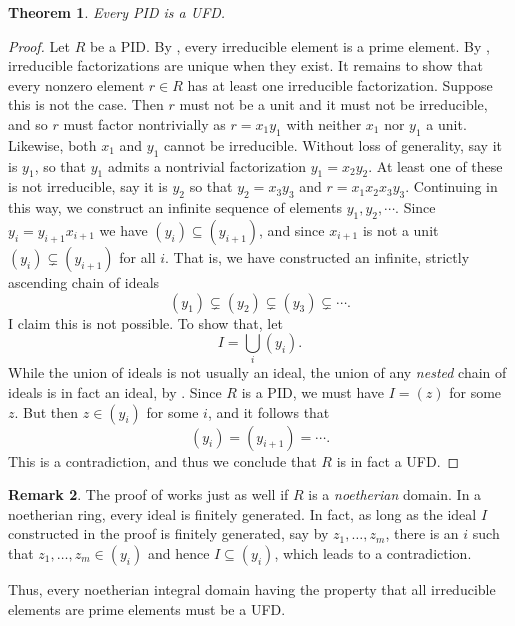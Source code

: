 \documentclass[12pt]{report}
\newtheorem{theorem}{Theorem}[chapter]
\numberwithin{equation}{section}
\numberwithin{theorem}{chapter}
\theoremstyle{definition}
\newtheorem*{basic properties}{Basic Properties}
\newtheorem*{Important Remark}{Important Remark}
\newtheorem{remark}[theorem]{Remark}
\begin{document}
\begin{theorem}\label{PID implies UFD}
Every PID is a UFD.
\end{theorem}

\begin{proof} 
Let $R$ be a PID.
By , every irreducible element is a prime element.
By , irreducible factorizations are unique when they exist. 
It remains to show that every nonzero element $r \in R$ has at least one irreducible factorization. Suppose this is not the case. Then $r$ must not be a unit and it must not be irreducible, and so $r$ must factor nontrivially as $r =x_1 y_1$ with neither $x_1$ nor $y_1$ a unit. Likewise, both $x_1$ and $y_1$ cannot be irreducible. Without loss of generality, say it is $y_1$, so that $y_1$ admits a nontrivial factorization $y_1 = x_2 y_2$. At least one of these is not irreducible, say it is $y_2$ so that $y_2 = x_3 y_3$ and $r = x_1x_2x_3y_3$. 
Continuing in this way, we construct an infinite sequence of elements $y_1, y_2, \cdots$.
Since $y_i = y_{i+1}x_{i+1}$ we have $(y_i) \subseteq (y_{i+1})$, and since $x_{i+1}$ is not a unit $(y_i) \subsetneq (y_{i+1})$ for all $i$.
That is, we have constructed an infinite, strictly ascending chain of ideals
$$(y_1) \subsetneq (y_2) \subsetneq (y_3) \subsetneq \cdots.$$
I claim this is not possible. To show that, let 
$$I = \bigcup_i (y_i).$$ 
While the union of ideals is not usually an ideal, the union of any {\em nested} chain of ideals is in fact an ideal, by . Since $R$ is a PID, we must have $I = (z)$ for some $z$. But then $z \in (y_i)$ for
some $i$, and it follows that 
$$(y_i) = (y_{i+1}) = \cdots.$$
This is a contradiction, and thus we conclude that $R$ is in fact a UFD.
\end{proof}


\begin{remark} 
The proof of  works just as well if $R$ is a {\em noetherian} domain. In a noetherian ring, every ideal is finitely generated. In fact, as long as the ideal $I$ constructed in the proof is finitely generated, say by $z_1, \dots, z_m$, there is an $i$ such that $z_1, \dots, z_m \in (y_i)$ and hence $I \subseteq (y_i)$, which leads to a contradiction.

Thus,  every noetherian integral domain having the property that all  irreducible elements are prime elements must be a UFD.
\end{remark}
\end{document}
